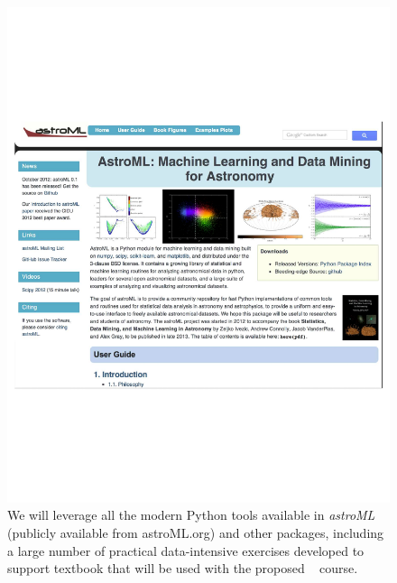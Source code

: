 \begin{figure}[!t]
\vskip -1.9in
\phantom{x} \hskip 0.7in
\includegraphics[width=0.8\hsize,clip]{astroML.pdf}
\vskip -1.6in
\caption{We will leverage all the modern Python tools available in {\it astroML} (publicly
available from astroML.org) and
other packages, including a large number of practical data-intensive exercises developed to
support textbook that will be used with the proposed \astrocl~ course.} 
\label{Fig:astroML}
\end{figure}

